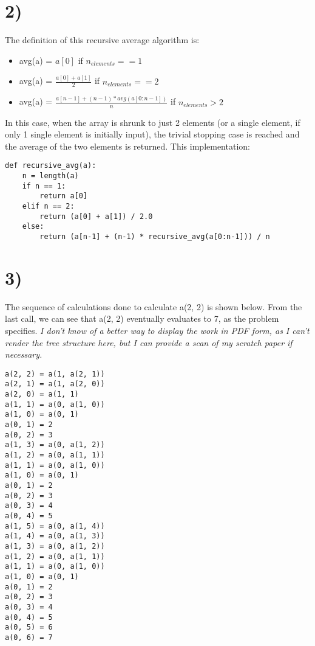 \documentclass[a4paper,11pt]{article}
\begin{document}

\section*{2)}

The definition of this recursive average algorithm is: 
\begin{itemize}
  \item avg(a) = $a[0]$ if $n_{elements}== 1$
  \item avg(a) = $\frac{a[0]  + a[1]}{2}$  if $n_{elements} == 2$
  \item avg(a) = $\frac{a[n-1] + (n-1) * avg(a[0:n-1])}{n}$  if $n_{elements} > 2$
\end{itemize}
  
\noindent In this case, when the array is shrunk to just 2 elements (or a single element, if only 1 single element is initially input), the trivial stopping case is reached and the average of the two elements is returned.  This implementation:
  
\begin{verbatim}
def recursive_avg(a):
    n = length(a)
    if n == 1:
        return a[0]
    elif n == 2:
        return (a[0] + a[1]) / 2.0
    else:
        return (a[n-1] + (n-1) * recursive_avg(a[0:n-1])) / n
\end{verbatim}


\section*{3)} 
The sequence of calculations done to calculate a(2, 2) is shown below.  From the last call, we can see that a(2, 2) eventually evaluates to 7, as the problem specifies.
{\it I don't know of a better way to display the work in PDF form, as I can't render the tree structure here, but I can provide a scan of my scratch paper if necessary.}
\begin{verbatim}
a(2, 2) = a(1, a(2, 1))
a(2, 1) = a(1, a(2, 0))
a(2, 0) = a(1, 1)
a(1, 1) = a(0, a(1, 0))
a(1, 0) = a(0, 1)
a(0, 1) = 2
a(0, 2) = 3
a(1, 3) = a(0, a(1, 2))
a(1, 2) = a(0, a(1, 1))
a(1, 1) = a(0, a(1, 0))
a(1, 0) = a(0, 1)
a(0, 1) = 2
a(0, 2) = 3
a(0, 3) = 4
a(0, 4) = 5
a(1, 5) = a(0, a(1, 4))
a(1, 4) = a(0, a(1, 3))
a(1, 3) = a(0, a(1, 2))
a(1, 2) = a(0, a(1, 1))
a(1, 1) = a(0, a(1, 0))
a(1, 0) = a(0, 1)
a(0, 1) = 2
a(0, 2) = 3
a(0, 3) = 4
a(0, 4) = 5
a(0, 5) = 6
a(0, 6) = 7
\end{verbatim}
\end{document}
